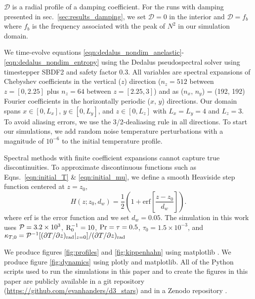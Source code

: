 $\mathcal{D}$ is a radial profile of a damping coefficient.
For the runs with damping presented in sec.~\ref{sec:results_damping}, we set $\mathcal{D} = 0$ in the interior and $\mathcal{D} = f_b$ where $f_b$ is the frequency associated with the peak of $N^2$ in our simulation domain.


We time-evolve equations \ref{eqn:dedalus_nondim_anelastic}-\ref{eqn:dedalus_nondim_entropy} using the Dedalus pseudospectral solver \citep[git commit 1339061]{burns_etal_2020} using timestepper SBDF2 \citep{wang_ruuth_2008} and safety factor 0.3.
All variables are spectral expansions of Chebyshev coefficients in the vertical ($z$) direction ($n_z = 512$ between $z=[0, 2.25]$ plus $n_z = 64$ between $z=[2.25, 3]$) and as ($n_x$, $n_y$) = (192, 192) Fourier coefficients in the horizontally periodic ($x$, $y$) directions.
Our domain spans $x \in [0, L_x]$, $y \in [0, L_y]$, and $z \in [0, L_z]$ with $L_x = L_y = 4$ and $L_z = 3$.
To avoid aliasing errors, we use the 3/2-dealiasing rule in all directions.
To start our simulations, we add random noise temperature perturbations with a magnitude of $10^{-6}$ to the initial temperature profile.

Spectral methods with finite coefficient expansions cannot capture true discontinuities.
To approximate discontinuous functions such as Eqns.~\ref{eqn:initial_T} \& \ref{eqn:initial_mu}, we define a smooth Heaviside step function centered at $z = z_0$,
\begin{equation}
H(z; z_0, d_w) = \frac{1}{2}\left(1 + \mathrm{erf}\left[\frac{z - z_0}{d_w}\right]\right).
\label{eqn:heaviside}
\end{equation}
where erf is the error function and we set $d_w = 0.05$.
The simulation in this work uses $\mathcal{P} = 3.2 \times 10^3$, $\mathrm{R}_{0}^{-1} = 10$, $\rm{Pr} = \tau = 0.5$, $\tau_0 = 1.5 \times 10^{-3}$, and ${\kappa_{T,0} = \mathcal{P}^{-1}[(\partial T/\partial z)_{\rm{rad}}|_{z=0}] / (\partial T/\partial z)_{\rm{rad}}}$

We produce figures \ref{fig:profiles} and \ref{fig:kippenhahn} using matplotlib \citep{hunter2007, mpl3.3.4}.
We produce figure \ref{fig:dynamics} using plotly \citep{plotly} and matplotlib.
All of the Python scripts used to run the simulations in this paper and to create the figures in this paper are publicly available in a git repository (\url{https://github.com/evanhanders/d3_stars}) and in a Zenodo repository \citep{supp}.
